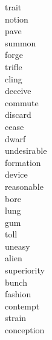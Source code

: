 \documentclass[b5paper, 11pt]{ctexart}
\begin{document}
\begin{multicols*}{3}
\begin{description}
\item[trait]

\item[notion]

\item[pave]

\item[summon]

\item[forge]

\item[trifle]

\item[cling]

\item[deceive]

\item[commute]

\item[discard]

\item[cease]

\item[dwarf]

\item[undesirable]

\item[formation]

\item[device]

\item[reasonable]

\item[bore]

\item[lung]

\item[gum]

\item[toll]

\item[uneasy]

\item[alien]

\item[superiority]

\item[bunch]

\item[fashion]

\item[contempt]

\item[strain]

\item[conception]


\end{description}
\end{multicols*}
\end{document}
